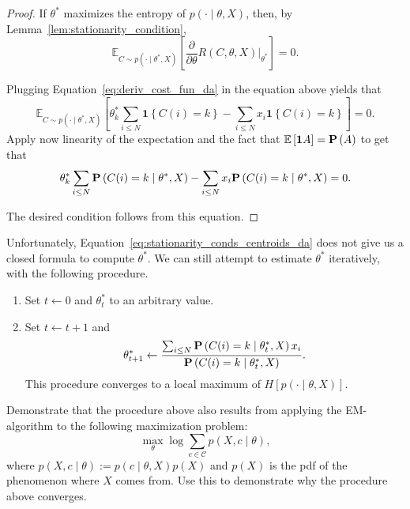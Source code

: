 \begin{proof}
If $\theta^*$ maximizes the entropy of $p(\cdot \mid \theta, X)$, then, by Lemma~\ref{lem:stationarity_condition},
%
\begin{equation}
\mathbb{E}_{C \sim p(\cdot \mid \theta^*, X)}\left[\frac{\partial}{\partial \theta} R(C, \theta, X)\Bigr|_{\theta^*}\right] = 0.
\end{equation}

Plugging Equation~\ref{eq:deriv_cost_fun_da} in the equation above yields that
%
\begin{equation}
\mathbb{E}_{C \sim p(\cdot \mid \theta^*, X)}\left[\theta^*_k \sum_{i \leq N} \mathbf{1}\left\{C(i) = k\right\} - \sum_{i \leq N} x_i \mathbf{1}\left\{C(i) = k\right\}\right] = 0.
\end{equation}
%
Apply now linearity of the expectation and the fact that $\mathbb{E}\left[\mathbf{1}A\right] = \mathbf{P}\left(A\right)$ to get that
%
\begin{equation}
\theta^*_k \sum_{i \leq N} \mathbf{P}\left(C(i) = k \mid \theta^*, X\right) - \sum_{i \leq N}x_i \mathbf{P}\left(C(i) = k \mid \theta^*, X\right) = 0.
\end{equation}

The desired condition follows from this equation.
\end{proof}

Unfortunately, Equation~\ref{eq:stationarity_conds_centroids_da} does not give us a closed formula to compute $\theta^*$. We can still attempt to estimate $\theta^*$ iteratively, with the following
procedure.

\begin{enumerate}
\item Set $t \gets 0$ and $\theta^*_t$ to an arbitrary value.
\item Set $t \gets t + 1$ and
%
\begin{equation}
\theta^*_{t+1} \gets \frac{\sum_{i \leq N} \mathbf{P}\left(C(i) = k \mid \theta^*_t, X\right)x_i}{\mathbf{P}\left(C(i) = k \mid \theta^*_t, X\right)}.
\end{equation}
%
This procedure converges to a local maximum of $H[p(\cdot \mid \theta, X)]$.
\end{enumerate}

\begin{exercise}
Demonstrate that the procedure above also results from applying
the EM-algorithm to the following maximization problem:
%
\begin{equation}
\max_{\theta} \log \sum_{c \in \mathcal{C}} p(X, c \mid \theta),
\end{equation}
%
where $p(X, c \mid \theta) := p(c \mid \theta, X)p(X)$ and $p(X)$ is the pdf of the phenomenon where $X$ comes from. Use this to demonstrate why the procedure above
converges.
\end{exercise}

